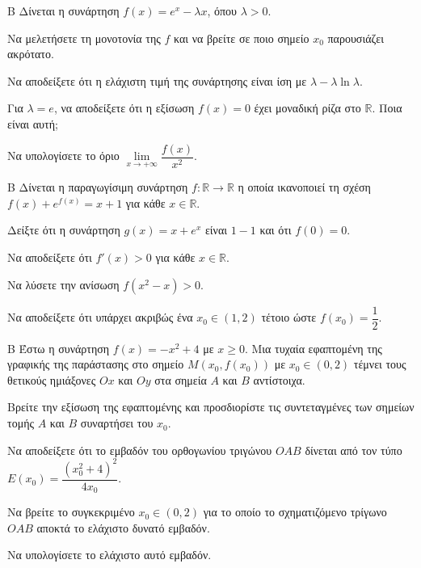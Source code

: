 \begin{thema}{Β}
Δίνεται η συνάρτηση $f(x) = e^x - \lambda x$, όπου $\lambda > 0$.
\begin{erwthma}
  \item Να μελετήσετε τη μονοτονία της $f$ και να βρείτε σε ποιο σημείο $x_0$ παρουσιάζει ακρότατο.
  \item Να αποδείξετε ότι η ελάχιστη τιμή της συνάρτησης είναι ίση με $\lambda - \lambda \ln \lambda$.
  \item Για $\lambda = e$, να αποδείξετε ότι η εξίσωση $f(x) = 0$ έχει μοναδική ρίζα στο $\mathbb{R}$. Ποια είναι αυτή;
  \item Να υπολογίσετε το όριο $\lim\limits_{x \to +\infty} \dfrac{f(x)}{x^2}$.
\end{erwthma}
\end{thema}

\begin{thema}{Β}
Δίνεται η παραγωγίσιμη συνάρτηση $f: \mathbb{R} \to \mathbb{R}$ η οποία ικανοποιεί τη σχέση $f(x) + e^{f(x)} = x + 1$ για κάθε $x \in \mathbb{R}$.
\begin{erwthma}
  \item Δείξτε ότι η συνάρτηση $g(x) = x + e^x$ είναι $1-1$ και ότι $f(0) = 0$.
  \item Να αποδείξετε ότι $f'(x) > 0$ για κάθε $x \in \mathbb{R}$.
  \item Να λύσετε την ανίσωση $f(x^2 - x) > 0$.
  \item Να αποδείξετε ότι υπάρχει ακριβώς ένα $x_0 \in (1, 2)$ τέτοιο ώστε $f(x_0) = \dfrac{1}{2}$.
\end{erwthma}
\end{thema}

\begin{thema}{Β}
Έστω η συνάρτηση $f(x) = -x^2+4$ με $x \ge 0$. Μια τυχαία εφαπτομένη της γραφικής της παράστασης στο σημείο $M(x_0, f(x_0))$ με $x_0 \in (0, 2)$ τέμνει τους θετικούς ημιάξονες $Ox$ και $Oy$ στα σημεία $A$ και $B$ αντίστοιχα.
\begin{erwthma}
  \item Βρείτε την εξίσωση της εφαπτομένης και προσδιορίστε τις συντεταγμένες των σημείων τομής $A$ και $B$ συναρτήσει του $x_0$.
  \item Να αποδείξετε ότι το εμβαδόν του ορθογωνίου τριγώνου $OAB$ δίνεται από τον τύπο $E(x_0) = \dfrac{(x_0^2+4)^2}{4x_0}$.
  \item Να βρείτε το συγκεκριμένο $x_0 \in (0, 2)$ για το οποίο το σχηματιζόμενο τρίγωνο $OAB$ αποκτά το ελάχιστο δυνατό εμβαδόν.
  \item Να υπολογίσετε το ελάχιστο αυτό εμβαδόν.
\end{erwthma}
\end{thema}


